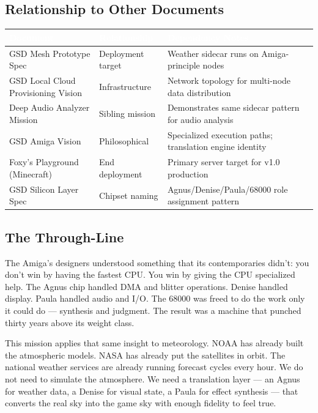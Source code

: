 \documentclass[11pt,letterpaper]{article}
\newcommand{\tableheader}[1]{\textbf{\sffamily\textcolor{white}{#1}}}
\begin{document}
\subsection{Relationship to Other Documents}

\begin{center}
\begin{tabularx}{\textwidth}{L{4.5cm}L{3cm}X}
\toprule
{}
\tableheader{Document} & \tableheader{Relationship} & \tableheader{Dependency Notes} \\
\midrule
GSD Mesh Prototype Spec & Deployment target & Weather sidecar runs on Amiga-principle nodes \\
GSD Local Cloud Provisioning Vision & Infrastructure & Network topology for multi-node data distribution \\
Deep Audio Analyzer Mission & Sibling mission & Demonstrates same sidecar pattern for audio analysis \\
GSD Amiga Vision & Philosophical & Specialized execution paths; translation engine identity \\
Foxy's Playground (Minecraft) & End deployment & Primary server target for v1.0 production \\
GSD Silicon Layer Spec & Chipset naming & Agnus/Denise/Paula/68000 role assignment pattern \\
\bottomrule
\end{tabularx}
\end{center}

\subsection{The Through-Line}

The Amiga's designers understood something that its contemporaries didn't: you don't win by having the fastest CPU. You win by giving the CPU specialized help. The Agnus chip handled DMA and blitter operations. Denise handled display. Paula handled audio and I/O. The 68000 was freed to do the work only it could do --- synthesis and judgment. The result was a machine that punched thirty years above its weight class.

This mission applies that same insight to meteorology. NOAA has already built the atmospheric models. NASA has already put the satellites in orbit. The national weather services are already running forecast cycles every hour. We do not need to simulate the atmosphere. We need a translation layer --- an Agnus for weather data, a Denise for visual state, a Paula for effect synthesis --- that converts the real sky into the game sky with enough fidelity to feel true.
\end{document}
